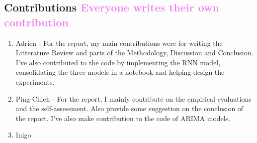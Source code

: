 \documentclass[12pt, letterpaper]{article}
\begin{document}
\subsection*{Contributions \textcolor{violet}{Everyone writes their own contribution}}
\begin{enumerate}
    \item Adrien - 
        For the report, my main contributions were for writing the Litterature Review and parts of the Methodology, Discussion and Conclusion. I've also contributed to the code by implementing the RNN model, consolidating the three models in a notebook and helping design the experiments.
    \item Ping-Chieh - 
        For the report, I mainly contribute on the empirical evaluations and the self-assessment. Also provide some suggestion on the conclusion of the report. I've also make contribution to the code of ARIMA models.
    \item Inigo
\end{enumerate}
\end{document}
